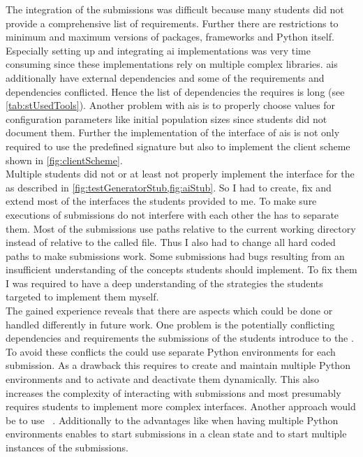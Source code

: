 The integration of the submissions was difficult because many students did not provide a comprehensive list of requirements.
Further there are restrictions to minimum and maximum versions of packages, frameworks and Python itself.
Especially setting up and integrating \gls{ai} implementations was very time consuming since these implementations rely on multiple complex libraries.
\Glspl{ai} additionally have external dependencies and some of the requirements and dependencies conflicted.
Hence the list of dependencies the \submissiontester{} requires is long (see \cref{tab:stUsedTools}).
Another problem with \glspl{ai} is to properly choose values for configuration parameters like initial population sizes since students did not document them.
Further the implementation of the interface of \glspl{ai} is not only required to use the predefined signature but also to implement the client scheme shown in \cref{fig:clientScheme}.\\
Multiple students did not or at least not properly implement the interface for the \submissiontester{} as described in \cref{fig:testGeneratorStub,fig:aiStub}.
So I had to create, fix and extend most of the interfaces the students provided to me.
To make sure executions of submissions do not interfere with each other the \submissiontester{} has to separate them.
Most of the submissions use paths relative to the current working directory instead of relative to the called file.
Thus I also had to change all hard coded paths to make submissions work.
Some submissions had bugs resulting from an insufficient understanding of the concepts students should implement.
To fix them I was required to have a deep understanding of the strategies the students targeted to implement them myself.\\
The gained experience reveals that there are aspects which could be done or handled differently in future work.
One problem is the potentially conflicting dependencies and requirements the submissions of the students introduce to the \submissiontester{}.
To avoid these conflicts the \submissiontester{} could use separate Python environments for each submission.
As a drawback this requires to create and maintain multiple Python environments and to activate and deactivate them dynamically.
This also increases the complexity of interacting with submissions and most presumably requires students to implement more complex interfaces.
Another approach would be to use \docker{}~\cite{docker}.
Additionally to the advantages like when having multiple Python environments \docker{} enables to start submissions in a clean state and to start multiple instances of the submissions.
